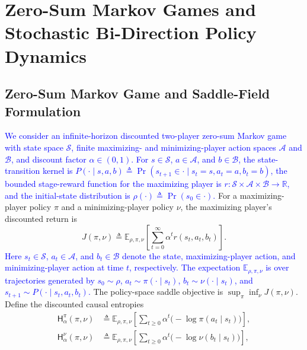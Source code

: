 \documentclass[journal]{IEEEtran}
\theoremstyle{remark}
\newcommand{\E}{\mathbb{E}}
\begin{document}
	\section{Zero-Sum Markov Games and Stochastic Bi-Direction Policy Dynamics}\label{sec:prelim}
	
	
	\subsection{Zero-Sum Markov Game and Saddle-Field Formulation}\label{subsec:formulation}
	
	\textcolor{blue}{We consider an infinite-horizon discounted two-player zero-sum Markov game with state space $\mathcal{S}$, finite maximizing- and minimizing-player action spaces $\mathcal{A}$ and $\mathcal{B}$, and discount factor $\alpha\in(0,1)$.}
	\textcolor{blue}{For $s\in\mathcal{S}$, $a\in\mathcal{A}$, and $b\in\mathcal{B}$, the state-transition kernel is $P(\cdot\mid s,a,b)\triangleq\Pr(s_{t+1}\in\cdot\mid s_t=s,a_t=a,b_t=b)$, the bounded stage-reward function for the maximizing player is $r:\mathcal{S}\times\mathcal{A}\times\mathcal{B}\to\mathbb{R}$, and the initial-state distribution is $\rho(\cdot)\triangleq\Pr(s_0\in\cdot)$.}
	For a maximizing-player policy $\pi$ and a minimizing-player policy $\nu$, the maximizing player's discounted return is
	\[
	J(\pi,\nu)
	\triangleq
	\E_{\rho,\pi,\nu}
	\!\left[
	\textstyle\sum_{t=0}^{\infty}\alpha^{t}r(s_{t},a_{t},b_{t})
	\right].
	\]
	\textcolor{blue}{Here $s_t\in\mathcal{S}$, $a_t\in\mathcal{A}$, and $b_t\in\mathcal{B}$ denote the state, maximizing-player action, and minimizing-player action at time $t$, respectively.}
	\textcolor{blue}{The expectation $\mathbb{E}_{\rho,\pi,\nu}$ is over trajectories generated by $s_0\sim\rho$, $a_t\sim\pi(\cdot\mid s_t)$, $b_t\sim\nu(\cdot\mid s_t)$, and $s_{t+1}\sim P(\cdot\mid s_t,a_t,b_t)$.}
	The policy-space saddle objective is $\sup_{\pi}\inf_{\nu} J(\pi,\nu)$.
	Define the discounted causal entropies
	\begin{align*}
		\mathsf H_{\alpha}^{\pi}(\pi,\nu)
		&\triangleq \E_{\rho,\pi,\nu}\!\left[\sum_{t\ge0}\alpha^t
		\bigl(-\log\pi(a_t\mid s_t)\bigr)\right],\\
		\mathsf H_{\alpha}^{\nu}(\pi,\nu)
		&\triangleq \E_{\rho,\pi,\nu}\!\left[\sum_{t\ge0}\alpha^t
		\bigl(-\log\nu(b_t\mid s_t)\bigr)\right],
	\end{align*}
\end{document}
